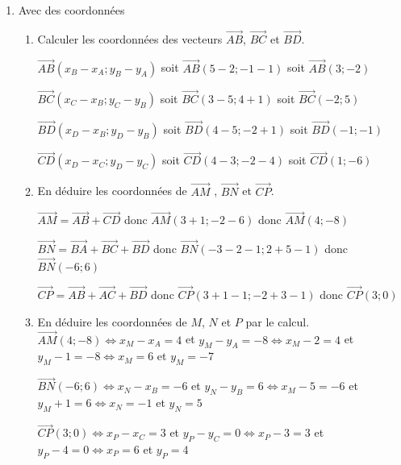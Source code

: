 \begin{enumerate}
\item Avec des coordonnées
\begin{enumerate}
\item Calculer les coordonnées des vecteurs $\overrightarrow{AB}$, $\overrightarrow{BC}$ et $\overrightarrow{BD}$.

$\overrightarrow{AB} (x_B - x_A;y_B - y_A)$ soit  $\overrightarrow{AB} (5 - 2;-1 - 1)$ soit  $\overrightarrow{AB} (3;-2)$


$\overrightarrow{BC} (x_C - x_B;y_C - y_B)$ soit  $\overrightarrow{BC} (3 - 5;4 + 1)$  soit  $\overrightarrow{BC} (-2;5)$


$\overrightarrow{BD} (x_D - x_B;y_D - y_B)$ soit  $\overrightarrow{BD} (4 - 5;-2 +1)$ soit  $\overrightarrow{BD} (-1;-1)$


$\overrightarrow{CD} (x_D - x_C;y_D - y_C)$ soit  $\overrightarrow{CD} (4 - 3;-2 -4)$ soit  $\overrightarrow{CD} (1;-6)$

\item En déduire les coordonnées de $\overrightarrow{AM}$ , $\overrightarrow{BN}$ et $\overrightarrow{CP}$.


$\overrightarrow{AM}=\overrightarrow{AB}+\overrightarrow{CD}$ donc $\overrightarrow{AM}(3+1;-2-6)$ donc $\overrightarrow{AM}(4;-8)$

$\overrightarrow{BN}=\overrightarrow{BA}+\overrightarrow{BC}+\overrightarrow{BD}$ donc $\overrightarrow{BN}(-3-2-1;2+5-1)$ donc $\overrightarrow{BN}(-6;6)$
 
$\overrightarrow{CP}=\overrightarrow{AB}+\overrightarrow{AC}+\overrightarrow{BD}$ donc $\overrightarrow{CP}(3+1-1;-2+3-1)$ donc $\overrightarrow{CP}(3;0)$

\item En déduire les coordonnées de $M$, $N$ et $P$ par le calcul.
$\overrightarrow{AM}(4;-8) \Longleftrightarrow x_M - x_A =4$ et $y_M - y_A =-8\Longleftrightarrow x_M - 2 =4$ et $y_M - 1 =-8\Longleftrightarrow x_M  =6$ et $y_M =-7$

$\overrightarrow{BN}(-6;6)\Longleftrightarrow x_N - x_B =-6$ et $y_N - y_B =6\Longleftrightarrow x_M - 5 =-6$ et $y_M +1 =6\Longleftrightarrow x_N  =-1$ et $y_N =5$


$\overrightarrow{CP}(3;0) \Longleftrightarrow x_P - x_C =3$ et $y_P - y_C =0\Longleftrightarrow x_P - 3 =3$ et $y_P - 4 =0\Longleftrightarrow x_P  =6$ et $y_P =4$

\end{enumerate}

\end{enumerate}